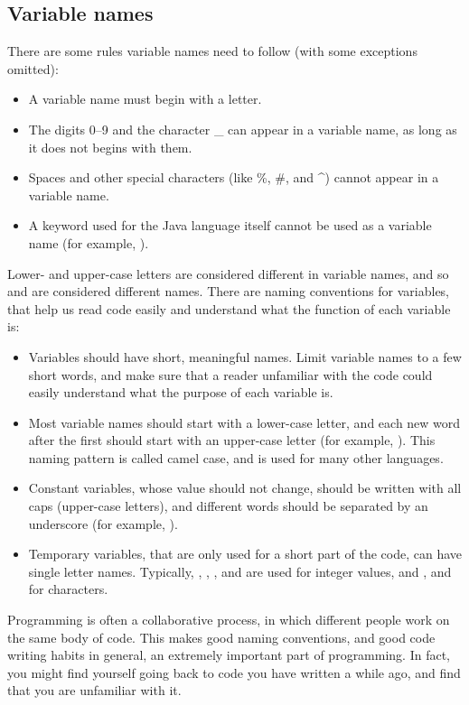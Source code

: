 \subsection{Variable names}

There are some rules variable names need to follow (with some exceptions omitted):

\begin{itemize}
\item A variable name must begin with a letter.
\item The digits 0--9 and the character \_ can appear in a variable name, as long as it does not begins with them. 	
\item Spaces and other special characters (like \%, \#, and \textasciicircum) cannot appear in a variable name.	
\item A keyword used for the Java language itself cannot be used as a variable name (for example, ).	
\end{itemize}	
Lower- and upper-case letters are considered different in variable names, and so  and  are considered different names. There are naming conventions for variables, that help us read code easily and understand what the function of each variable is:	
\begin{itemize}	
\item Variables should have short, meaningful names. Limit variable names to a few short words, and make sure that a reader unfamiliar with the code could easily understand what the purpose of each variable is. 	
\item Most variable names should start with a lower-case letter, and each new word after the first should start with an upper-case letter (for example, ). This naming pattern is called camel case, and is used for many other languages.	
\item Constant variables, whose value should not change, should be written with all caps (upper-case letters), and different words should be separated by an underscore (for example, ).	
\item Temporary variables, that are only used for a short part of the code, can have single letter names. Typically, , , ,  and  are used for integer values, and ,  and  for characters.
\end{itemize}

Programming is often a collaborative process, in which different people work on the same body of code. This makes good naming conventions, and good code writing habits in general, an extremely important part of programming. In fact, you might find yourself going back to code you have written a while ago, and find that you are unfamiliar with it.

